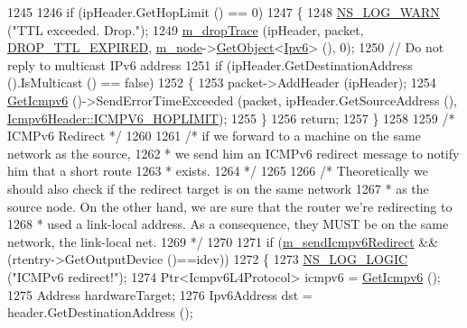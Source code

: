 \begin{DoxyCode}
1245 
1246   \textcolor{keywordflow}{if} (ipHeader.GetHopLimit () == 0)
1247     \{
1248       \hyperlink{group__logging_gade7208b4009cdf0e25783cd26766f559}{NS\_LOG\_WARN} (\textcolor{stringliteral}{"TTL exceeded.  Drop."});
1249       \hyperlink{classns3_1_1Ipv6L3Protocol_ac22d2d63cac436267ae6cafc46880a6e}{m\_dropTrace} (ipHeader, packet, \hyperlink{classns3_1_1Ipv6L3Protocol_a33c64db9bc35f71ff368b132bfffa37aa49c4e7173190b1bbba7d6300b06a16ed}{DROP\_TTL\_EXPIRED}, 
      \hyperlink{classns3_1_1Ipv6L3Protocol_a543d8509395ee76de15d039ff1fce642}{m\_node}->\hyperlink{classns3_1_1Object_a13e18c00017096c8381eb651d5bd0783}{GetObject}<\hyperlink{classns3_1_1Ipv6_adccc58acd14d3f9a28f75dc09e794998}{Ipv6}> (), 0);
1250       \textcolor{comment}{// Do not reply to multicast IPv6 address}
1251       \textcolor{keywordflow}{if} (ipHeader.GetDestinationAddress ().IsMulticast () == \textcolor{keyword}{false})
1252         \{
1253           packet->AddHeader (ipHeader);
1254           \hyperlink{classns3_1_1Ipv6L3Protocol_a10384a4dc85c61e65cf73b47ec9da90d}{GetIcmpv6} ()->SendErrorTimeExceeded (packet, ipHeader.GetSourceAddress (), 
      \hyperlink{classns3_1_1Icmpv6Header_a643af752203ad4456f89d3d1ab49943aa2f477ba611ff7d0606adbca6c61e318d}{Icmpv6Header::ICMPV6\_HOPLIMIT});
1255         \}
1256       \textcolor{keywordflow}{return};
1257     \}
1258 
1259   \textcolor{comment}{/* ICMPv6 Redirect */}
1260 
1261   \textcolor{comment}{/* if we forward to a machine on the same network as the source,}
1262 \textcolor{comment}{   * we send him an ICMPv6 redirect message to notify him that a short route}
1263 \textcolor{comment}{   * exists.}
1264 \textcolor{comment}{   */}
1265 
1266   \textcolor{comment}{/* Theoretically we should also check if the redirect target is on the same network}
1267 \textcolor{comment}{   * as the source node. On the other hand, we are sure that the router we're redirecting to}
1268 \textcolor{comment}{   * used a link-local address. As a consequence, they MUST be on the same network, the link-local net.}
1269 \textcolor{comment}{   */}
1270 
1271   \textcolor{keywordflow}{if} (\hyperlink{classns3_1_1Ipv6L3Protocol_a23aef420bfb1d9dd634681c4a78a0352}{m\_sendIcmpv6Redirect} && (rtentry->GetOutputDevice ()==idev))
1272     \{
1273       \hyperlink{group__logging_ga88acd260151caf2db9c0fc84997f45ce}{NS\_LOG\_LOGIC} (\textcolor{stringliteral}{"ICMPv6 redirect!"});
1274       Ptr<Icmpv6L4Protocol> icmpv6 = \hyperlink{classns3_1_1Ipv6L3Protocol_a10384a4dc85c61e65cf73b47ec9da90d}{GetIcmpv6} ();
1275       Address hardwareTarget;
1276       Ipv6Address dst = header.GetDestinationAddress ();

\end{DoxyCode}
